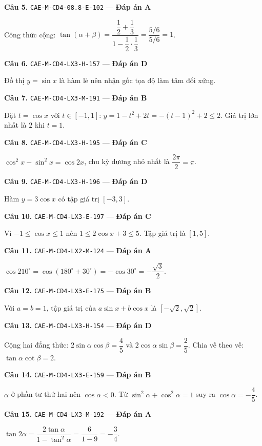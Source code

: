 \documentclass[11pt, a4paper]{article}
\begin{document}
\textbf{Câu 5.} \texttt{CAE-M-CD4-08.8-E-102} — \textbf{Đáp án A}

Công thức cộng: $\tan(\alpha + \beta) = \dfrac{\dfrac{1}{2} + \dfrac{1}{3}}{1 - \dfrac{1}{2} \cdot \dfrac{1}{3}} = \dfrac{5/6}{5/6} = 1$.

\textbf{Câu 6.} \texttt{CAE-M-CD4-LX3-H-157} — \textbf{Đáp án D}

Đồ thị $y = \sin x$ là hàm lẻ nên nhận gốc tọa độ làm tâm đối xứng.

\textbf{Câu 7.} \texttt{CAE-M-CD4-LX3-M-191} — \textbf{Đáp án B}

Đặt $t = \cos x$ với $t \in [-1, 1]$: $y = 1 - t^2 + 2t = -(t-1)^2 + 2 \le 2$. Giá trị lớn nhất là $2$ khi $t = 1$.

\textbf{Câu 8.} \texttt{CAE-M-CD4-LX3-H-195} — \textbf{Đáp án C}

$\cos^2 x - \sin^2 x = \cos 2x$, chu kỳ dương nhỏ nhất là $\dfrac{2\pi}{2} = \pi$.

\textbf{Câu 9.} \texttt{CAE-M-CD4-LX3-H-196} — \textbf{Đáp án D}

Hàm $y = 3\cos x$ có tập giá trị $[-3, 3]$.

\textbf{Câu 10.} \texttt{CAE-M-CD4-LX3-E-197} — \textbf{Đáp án C}

Vì $-1 \le \cos x \le 1$ nên $1 \le 2\cos x + 3 \le 5$. Tập giá trị là $[1, 5]$.

\textbf{Câu 11.} \texttt{CAE-M-CD4-LX2-M-124} — \textbf{Đáp án A}

$\cos 210^\circ = \cos(180^\circ + 30^\circ) = -\cos 30^\circ = -\dfrac{\sqrt{3}}{2}$.

\textbf{Câu 12.} \texttt{CAE-M-CD4-LX3-E-175} — \textbf{Đáp án B}

Với $a = b = 1$, tập giá trị của $a\sin x + b\cos x$ là $[-\sqrt{2}, \sqrt{2}]$.

\textbf{Câu 13.} \texttt{CAE-M-CD4-LX3-H-154} — \textbf{Đáp án D}

Cộng hai đẳng thức: $2\sin\alpha\cos\beta = \dfrac{4}{5}$ và $2\cos\alpha\sin\beta = \dfrac{2}{5}$. Chia vế theo vế: $\tan\alpha\cot\beta = 2$.

\textbf{Câu 14.} \texttt{CAE-M-CD4-LX3-E-159} — \textbf{Đáp án B}

$\alpha$ ở phần tư thứ hai nên $\cos\alpha < 0$. Từ $\sin^2\alpha + \cos^2\alpha = 1$ suy ra $\cos\alpha = -\dfrac{4}{5}$.

\textbf{Câu 15.} \texttt{CAE-M-CD4-LX3-M-192} — \textbf{Đáp án A}

$\tan 2\alpha = \dfrac{2\tan\alpha}{1 - \tan^2\alpha} = \dfrac{6}{1 - 9} = -\dfrac{3}{4}$.
\end{document}
